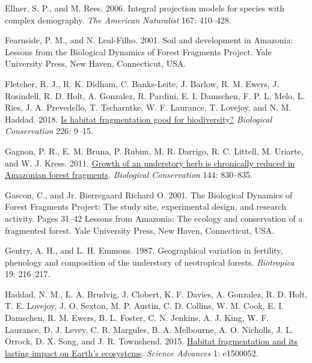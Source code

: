 \documentclass[
  man, donotrepeattitle,floatsintext]{apa6}
\newlength{\cslhangindent}
\newlength{\cslentryspacingunit} %
\newenvironment{CSLReferences}[2] %
 {%
  \setlength{\parindent}{0pt}
  \ifodd #1
  \let\oldpar\par
  \def\par{\hangindent=\cslhangindent\oldpar}
  \fi
  \setlength{\parskip}{#2\cslentryspacingunit}
 }%
 {}
\begin{document}
\begin{CSLReferences}{1}{0}
\leavevmode{}%
Ellner, S. P., and M. Rees. 2006. Integral projection models for species with complex demography. \emph{The American Naturalist} 167: 410--428.

\leavevmode{}%
Fearnside, P. M., and N. Leal-Filho. 2001. Soil and development in {Amazonia}: {Lessons} from the {Biological} {Dynamics} of {Forest} {Fragments} {Project}. Yale University Press, New Haven, Connecticut, USA.

\leavevmode{}%
Fletcher, R. J., R. K. Didham, C. Banks-Leite, J. Barlow, R. M. Ewers, J. Rosindell, R. D. Holt, A. Gonzalez, R. Pardini, E. I. Damschen, F. P. L. Melo, L. Ries, J. A. Prevedello, T. Tscharntke, W. F. Laurance, T. Lovejoy, and N. M. Haddad. 2018. \href{https://doi.org/10.1016/j.biocon.2018.07.022}{Is habitat fragmentation good for biodiversity?} \emph{Biological Conservation} 226: 9--15.

\leavevmode{}%
Gagnon, P. R., E. M. Bruna, P. Rubim, M. R. Darrigo, R. C. Littell, M. Uriarte, and W. J. Kress. 2011. \href{https://doi.org/10.1016/j.biocon.2010.11.015}{Growth of an understory herb is chronically reduced in {Amazonian} forest fragments}. \emph{Biological Conservation} 144: 830--835.

\leavevmode{}%
Gascon, C., and Jr. Bierregaard Richard O. 2001. The {Biological} {Dynamics} of {Forest} {Fragments} {Project}: The study site, experimental design, and research activity. Pages 31--42 Lessons from {Amazonia}: The ecology and conservation of a fragmented forest. Yale University Press, New Haven, Connecticut, USA.

\leavevmode{}%
Gentry, A. H., and L. H. Emmons. 1987. Geographical variation in fertility, phenology and composition of the understory of neotropical forests. \emph{Biotropica} 19: 216--217.

\leavevmode{}%
Haddad, N. M., L. A. Brudvig, J. Clobert, K. F. Davies, A. Gonzalez, R. D. Holt, T. E. Lovejoy, J. O. Sexton, M. P. Austin, C. D. Collins, W. M. Cook, E. I. Damschen, R. M. Ewers, B. L. Foster, C. N. Jenkins, A. J. King, W. F. Laurance, D. J. Levey, C. R. Margules, B. A. Melbourne, A. O. Nicholls, J. L. Orrock, D. X. Song, and J. R. Townshend. 2015. \href{https://doi.org/10.1126/sciadv.1500052}{Habitat fragmentation and its lasting impact on {Earth}'s ecosystems}. \emph{Science Advances} 1: e1500052.


\end{CSLReferences}
\end{document}
